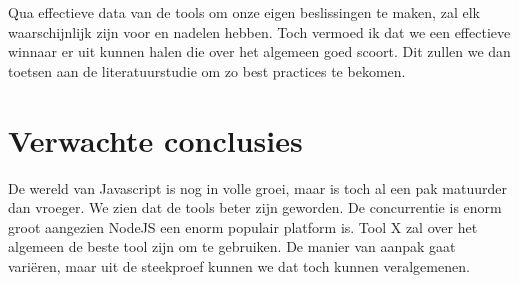 Qua effectieve data van de tools om onze eigen beslissingen te maken, zal elk waarschijnlijk zijn voor en nadelen hebben. Toch vermoed ik dat we een effectieve winnaar er uit kunnen halen die over het algemeen goed scoort. Dit zullen we dan toetsen aan de literatuurstudie om zo best practices te bekomen.

\section{Verwachte conclusies}
\label{sec:verwachte_conclusies}

De wereld van Javascript is nog in volle groei, maar is toch al een pak matuurder dan vroeger. We zien dat de tools beter zijn geworden. De concurrentie is enorm groot aangezien NodeJS een enorm populair platform is. Tool X zal over het algemeen de beste tool zijn om te gebruiken. De manier van aanpak gaat variëren, maar uit de steekproef kunnen we dat toch kunnen veralgemenen. 